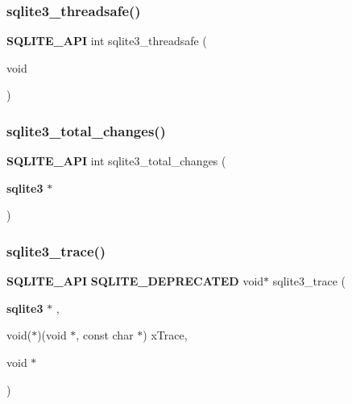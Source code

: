 \mbox{\label{sqlite3_8h_ab208491ead211947857f18352769df00}} 
\subsubsection{sqlite3\_threadsafe()}
{\footnotesize\ttfamily \textbf{ S\+Q\+L\+I\+T\+E\+\_\+\+A\+PI} int sqlite3\+\_\+threadsafe (\begin{DoxyParamCaption}\item[{void}]{ }\end{DoxyParamCaption})}

\mbox{\label{sqlite3_8h_a8ab96ed8dd8e90baa12daf08e4acc05e}} 
\subsubsection{sqlite3\_total\_changes()}
{\footnotesize\ttfamily \textbf{ S\+Q\+L\+I\+T\+E\+\_\+\+A\+PI} int sqlite3\+\_\+total\+\_\+changes (\begin{DoxyParamCaption}\item[{\textbf{ sqlite3} $\ast$}]{ }\end{DoxyParamCaption})}

\mbox{\label{sqlite3_8h_aeef01c202067c4e0bf9a215da3259ea4}} 
\subsubsection{sqlite3\_trace()}
{\footnotesize\ttfamily \textbf{ S\+Q\+L\+I\+T\+E\+\_\+\+A\+PI} \textbf{ S\+Q\+L\+I\+T\+E\+\_\+\+D\+E\+P\+R\+E\+C\+A\+T\+ED} void$\ast$ sqlite3\+\_\+trace (\begin{DoxyParamCaption}\item[{\textbf{ sqlite3} $\ast$}]{,  }\item[{void($\ast$)(void $\ast$, const char $\ast$)}]{x\+Trace,  }\item[{void $\ast$}]{ }\end{DoxyParamCaption})}

\mbox{\label{sqlite3_8h_a072c27c389a842aa3f9f5525dd078877}} 
